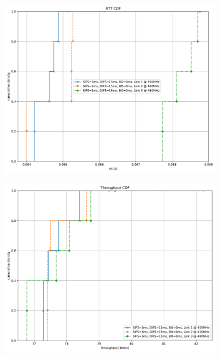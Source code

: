 \documentclass{article}
\begin{document}
\begin{figure}
	\includegraphics[width=\textwidth]{no_bo_single/cdf/rtt_cdf}
\end{figure}

\begin{figure}
	\includegraphics[width=\textwidth]{no_bo_single/cdf/throughput_cdf}
\end{figure}
\end{document}

